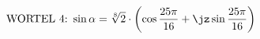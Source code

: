 \begin{equation}
\text{WORTEL 4:~} \sin{\alpha} =\sqrt[8]{2} \cdot \left(\cos{\frac{25\pi}{16}}
+ \jz \sin{\frac{25\pi}{16}} \right)
\end{equation}
